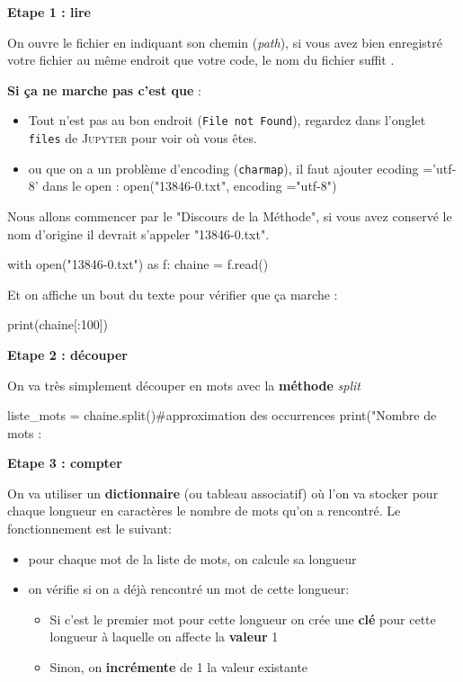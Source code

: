 \textbf{Etape 1 : lire}

On ouvre le fichier en indiquant son chemin (\textit{path}), si vous avez bien enregistré votre fichier au même endroit que votre code, le nom du fichier suffit
.

\textbf{Si ça ne marche pas c'est que} :
\begin{itemize}
  \item Tout n'est pas au bon endroit (\texttt{File not Found}), regardez dans l'onglet \texttt{files} de \textsc{Jupyter} pour voir où vous êtes.
  \item ou que on a un problème d'encoding (\texttt{charmap}), il faut ajouter ecoding ='utf-8' dans le open : open("13846-0.txt", encoding ="utf-8")
\end{itemize}

Nous allons commencer par le "Discours de la Méthode", si vous avez conservé le nom d'origine il devrait s'appeler "13846-0.txt".

\begin{python}
with open("13846-0.txt") as f:
  chaine = f.read()
\end{python}

Et on affiche un bout du texte pour vérifier que ça marche :

\begin{python}
print(chaine[:100])
\end{python}


\textbf{Etape 2 : découper}

On va très simplement découper en mots avec la \textbf{méthode} \textit{split}
\begin{python}
liste_mots = chaine.split()#approximation des occurrences
print("Nombre de mots : %
\end{python}


\textbf{Etape 3 : compter}

On va utiliser un \textbf{dictionnaire} (ou tableau associatif) où l'on va stocker pour chaque longueur en caractères le nombre de mots qu'on a rencontré. Le fonctionnement est le suivant:
\begin{itemize}
  \item pour chaque mot de la liste de mots, on calcule sa longueur
  \item on vérifie si on a déjà rencontré un mot de cette longueur:
  \begin{itemize}
    \item Si c'est le premier mot pour cette longueur on crée une \textbf{clé} pour cette longueur à laquelle on affecte la \textbf{valeur} 1
    \item Sinon, on \textbf{incrémente} de 1 la valeur existante
  \end{itemize}
\end{itemize}

